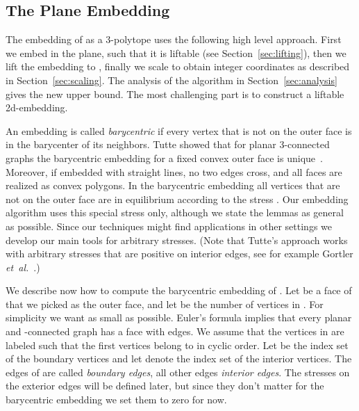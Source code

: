 \documentclass{article}
\theoremstyle{plain} \newtheorem{thm}{Theorem}[section]
\newcommand{\etal}{\emph{et~al.}}
\begin{document}
\subsection{The Plane Embedding}

The embedding of  as a 3-polytope uses the following high level approach.
First we embed  in the plane, such that it is liftable (see Section~\ref{sec:lifting}), then we lift the embedding to , finally we scale to obtain integer coordinates as described in Section~\ref{sec:scaling}. The analysis of the algorithm in Section~\ref{sec:analysis} gives the new upper bound. The most challenging part is to construct a liftable 2d-embedding. 










An embedding is called \emph{barycentric} if every vertex that is not
on the outer face is in the barycenter of its neighbors. Tutte showed
that for planar 3-connected graphs the barycentric embedding for a
fixed convex outer face is unique~\cite{t-crg-60,t-hdg-63}. Moreover,
if embedded with straight lines, no two edges cross, and all faces are
realized as convex polygons.  In the barycentric embedding all
vertices that are not on the outer face are in equilibrium according
to the stress . Our embedding algorithm uses this
special stress only, although we state the lemmas as general as possible. Since our techniques might find applications in
other settings we develop our main tools for arbitrary
stresses. (Note that Tutte's approach works with
arbitrary stresses that are positive on interior
edges, see for example Gortler \etal~\cite{ggt-dofma-06}.)




We describe now how to compute the barycentric embedding of . 
Let  be a face of  that we picked as the outer face, and let 
 be the number of vertices in . For simplicity we want  as small as 
possible. 
Euler's formula implies that every planar and -connected graph has a face  with  edges. 
We assume that the vertices in  are labeled such that the first  vertices
belong to  in cyclic order. 
Let  be the index set of the boundary vertices and let  denote the index set
of the interior  vertices.
The edges of  are called \textit{boundary edges},
all other edges \textit{interior edges}. 
The stresses on the exterior edges will be defined later, but since they don't matter for the barycentric embedding we set them to zero for now.
\end{document}
